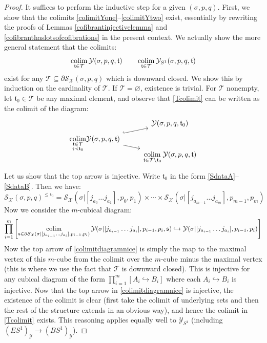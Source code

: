 \documentclass[12pt]{article}
\theoremstyle{definition}
\theoremstyle{remark}
\numberwithin{equation}{subsection}
\newcommand{\T}{\mathcal T}
\newcommand{\s}{\mathfrak s}
\newcommand{\ttt}{\mathfrak t}
\newcommand{\X}{\mathcal X}
\newcommand{\Y}{\mathcal Y}
\newcommand{\SSS}{\mathcal S}
\newcommand{\colim}{\operatornamewithlimits{colim}}
\begin{document}
\begin{proof}
It suffices to perform the inductive step for a given $(\sigma,p,q)$.  First, we show that the colimits \eqref{colimitYone}--\eqref{colimitYtwo} exist, essentially by rewriting the proofs of Lemmas \ref{cofibrantinjectivelemma} and \ref{cofibranthaslotsofcofibrations} in the present context.  We actually show the more general statement that the colimits:
\begin{equation}\label{Tcolimit}
\colim_{\ttt\in\T}\Y(\sigma,p,q,\ttt)\qquad\colim_{\ttt\in\T}\Y_{S^1}(\sigma,p,q,\ttt)
\end{equation}
exist for any $\T\subseteq\partial\SSS_\X(\sigma,p,q)$ which is downward closed.  We show this by induction on the cardinality of $\T$.  If $\T=\varnothing$, existence is trivial.  For $\T$ nonempty, let $\ttt_0\in\T$ be any maximal element, and observe that \eqref{Tcolimit} can be written as the colimit of the diagram:
\begin{equation}\label{colimitdiagramnice}
\begin{tikzcd}[row sep = tiny]
&\Y(\sigma,p,q,\ttt_0)\\
\smash{\displaystyle\colim_{\begin{smallmatrix}\ttt\in\T\cr\ttt\prec\ttt_0\end{smallmatrix}}}\Y(\sigma,p,q,\ttt)\ar[hook]{ur}\ar{rd}\\
&\displaystyle\colim_{\ttt\in\T\setminus\ttt_0}\Y(\sigma,p,q,\ttt)
\end{tikzcd}
\end{equation}
Let us show that the top arrow is injective.  Write $\ttt_0$ in the form \eqref{SdataA}--\eqref{SdataB}.  Then we have:
\begin{equation}
\SSS_\X(\sigma,p,q)^{\leq\ttt_0}=\SSS_\X(\sigma|[j_{a_0}\ldots j_{a_1}],p_0,p_1)\times\cdots\times\SSS_\X(\sigma|[j_{a_{m-1}}\ldots j_{a_m}],p_{m-1},p_m)
\end{equation}
Now we consider the $m$-cubical diagram:
\begin{equation}
\prod_{i=1}^m\left[\colim_{\s\in\partial\SSS_\X(\sigma|[j_{a_{i-1}}\ldots j_{a_i}],p_{i-1},p_i)}\Y(\sigma|[j_{a_{i-1}}\ldots j_{a_i}],p_{i-1},p_i,\s)\hookrightarrow\Y(\sigma|[j_{a_{i-1}}\ldots j_{a_i}],p_{i-1},p_i)\right]
\end{equation}
Now the top arrow of \eqref{colimitdiagramnice} is simply the map to the maximal vertex of this $m$-cube from the colimit over the $m$-cube minus the maximal vertex (this is where we use the fact that $\T$ is downward closed).  This is injective for any cubical diagram of the form $\prod_{i=1}^m[A_i\hookrightarrow B_i]$ where each $A_i\hookrightarrow B_i$ is injective.  Now that the top arrow in \eqref{colimitdiagramnice} is injective, the existence of the colimit is clear (first take the colimit of underlying sets and then the rest of the structure extends in an obvious way), and hence the colimit in \eqref{Tcolimit} exists.  This reasoning applies equally well to $\Y_{S^1}$ (including $(ES^1)_\Y\to(BS^1)_\Y$).


\end{proof}
\end{document}
